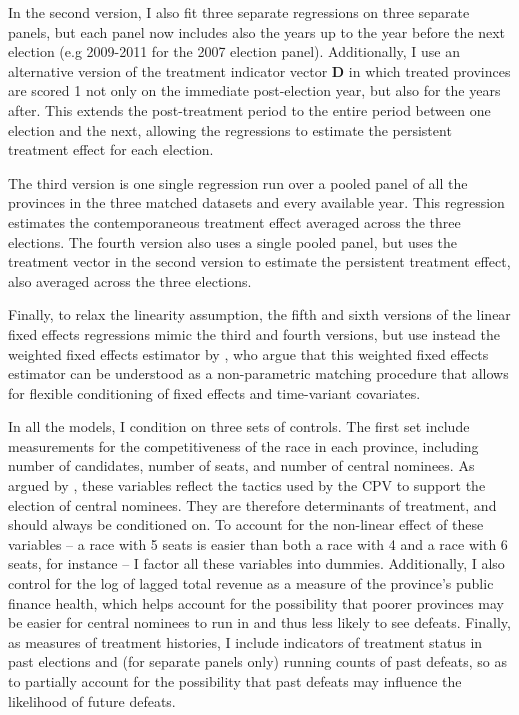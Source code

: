 \documentclass[12pt]{article}\usepackage[]{graphicx}\usepackage[]{color}
\newcommand{\1}{\mathbbm{1}}
\begin{document}
In the second version, I also fit three separate regressions on three separate panels, but each panel now includes also the years up to the year before the next election (e.g 2009-2011 for the 2007 election panel). Additionally, I use an alternative version of the treatment indicator vector $\mathbf{D}$ in which treated provinces are scored 1 not only on the immediate post-election year, but also for the years after. This extends the post-treatment period to the entire period between one election and the next, allowing the regressions to estimate the persistent treatment effect for each election.

The third version is one single regression run over a pooled panel of all the provinces in the three matched datasets and every available year. This regression estimates the contemporaneous treatment effect averaged across the three elections. The fourth version also uses a single pooled panel, but uses the treatment vector in the second version to estimate the persistent treatment effect, also averaged across the three elections.

Finally, to relax the linearity assumption, the fifth and sixth versions of the linear fixed effects regressions mimic the third and fourth versions, but use instead the weighted fixed effects estimator by \cite{ImaiKim2012}, who argue that this weighted fixed effects estimator can be understood as a non-parametric matching procedure that allows for flexible conditioning of fixed effects and time-variant covariates.

In all the models, I condition on three sets of controls. The first set include measurements for the competitiveness of the race in each province, including number of candidates, number of seats, and number of central nominees. As argued by \cite{MaleskySchuler2011}, these variables reflect the tactics used by the CPV to support the election of central nominees. They are therefore determinants of treatment, and should always be conditioned on. To account for the non-linear effect of these variables -- a race with 5 seats is easier than both a race with 4 and a race with 6 seats, for instance -- I factor all these variables into dummies. Additionally, I also control for the log of lagged total revenue as a measure of the province's public finance health, which helps account for the possibility that poorer provinces may be easier for central nominees to run in and thus less likely to see defeats. Finally, as measures of treatment histories, I include indicators of treatment status in past elections and (for separate panels only) running counts of past defeats, so as to partially account for the possibility that past defeats may influence the likelihood of future defeats.
\end{document}
